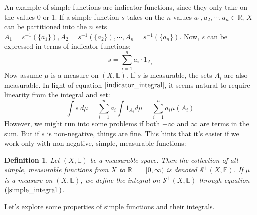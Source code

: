 \documentclass[12pt, a4paper]{article}
\newtheorem{definition}{Definition}[section]
\numberwithin{equation}{section}
\begin{document}
An example of simple functions are indicator functions, since they only take on the values 0 or 1. If a simple function $s$ takes on the $n$ values $a_1,a_2,\cdots,a_n\in\mathbb{R}$, $X$ can be partitioned into the $n$ sets $A_1=s^{-1}(\{a_1\}),A_2=s^{-1}(\{a_2\}),\cdots,A_n=s^{-1}(\{a_n\})$. Now, $s$ can be expressed in terms of indicator functions:
\begin{equation}
s=\sum_{i=1}^n a_i\cdot 1_{A_i}
\end{equation}
Now assume $\mu$ is a measure on $(X,\mathbb{E})$. If $s$ is measurable, the sets $A_i$ are also measurable. In light of equation $\ref{indicator_integral}$, it seems natural to require linearity from the integral and set:
\begin{equation}
\label{simple_integral}
\int s\ d\mu = \sum_{i=1}^n a_i\int 1_{A_i}d\mu = \sum_{i=1}^n a_i\mu(A_i)
\end{equation}
However, we might run into some problems if both $-\infty$ and $\infty$ are terms in the sum. But if $s$ is non-negative, things are fine. This hints that it's easier if we work only with non-negative, simple, measurable functions:

\begin{definition}
Let $(X,\mathbb{E})$ be a measurable space. Then the collection of all simple, measurable functions from $X$ to $\mathbb{R}_+=[0,\infty)$ is denoted $\mathcal{S}^+(X,\mathbb{E})$. If $\mu$ is a measure on $(X,\mathbb{E})$, we define the integral on $\mathcal{S}^+(X,\mathbb{E})$ through equation $(\ref{simple_integral})$.
\end{definition}

Let's explore some properties of simple functions and their integrals.
\end{document}
